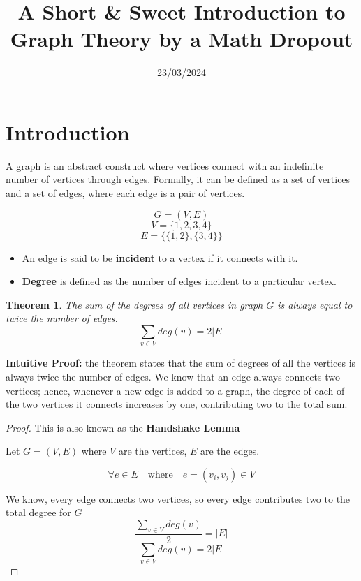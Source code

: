 \documentclass[12pt, letterpaper]{article}
\title{A Short \& Sweet Introduction to Graph Theory by a Math Dropout}
\author{}
\date{23/03/2024}
\newtheorem{theorem}{Theorem}
\begin{document}
\maketitle

\section*{Introduction}
A graph is an abstract construct where vertices connect with an indefinite number of vertices through edges. Formally, it can be defined as a set of vertices and a set of edges, where each edge is a pair of vertices.

\[G = (V, E) \]
\[V = \{1, 2, 3, 4\} \]
\[E = \{\{1, 2\}, \{3, 4\}\} \]

\begin{itemize}
    \item An edge is said to be \textbf{incident} to a vertex if it connects with it.
    \item \textbf{Degree} is defined as the number of edges incident to a particular vertex.    
\end{itemize}

\begin{theorem}
\label{thrm:sum-deg-equals-twice-edges}
The sum of the degrees of all vertices in graph $G$ is always equal to twice the number of edges.
\[
\sum_{v \in V} deg(v) = 2|E|
\]
\end{theorem}

\textbf{Intuitive Proof:} the theorem states that the sum of degrees of all the vertices is always twice the number of edges. We know that an edge always connects two vertices; hence, whenever a new edge is added to a graph, the degree of each of the two vertices it connects increases by one, contributing two to the total sum.

\begin{proof}
    This is also known as the \textbf{Handshake Lemma}
    
    Let $G = (V, E)$ where $V$ are the vertices, $E$ are the edges.

    \[
    \forall e \in E \quad \text{where} \quad e = (v_i, v_j) \in V 
    \]

    We know, every edge connects two vertices, so every edge contributes two to the total degree for $G$
    \[
    \frac{\sum_{v \in V} deg(v)}{2} = |E|
    \]
    \[
    \sum_{v \in V} deg(v) = 2|E|
    \]
\end{proof}
\end{document}
